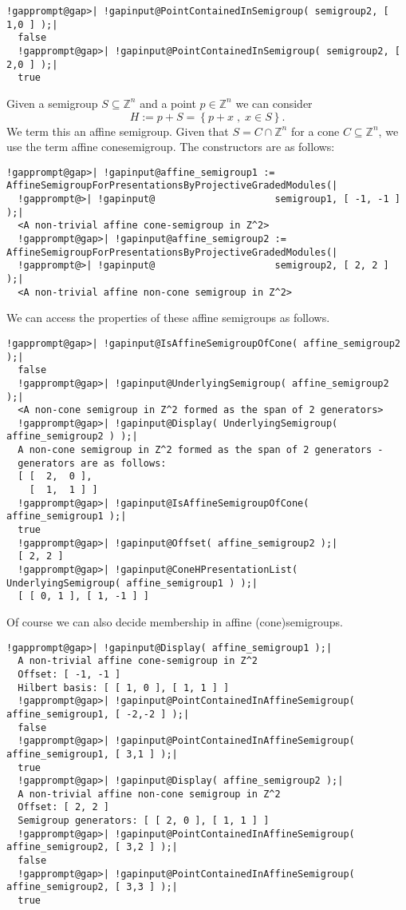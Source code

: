 \documentclass[a4paper,11pt]{report}
\begin{document}
{{\begin{Verbatim}[commandchars=!@|,fontsize=\small,frame=single,label=Example]
  !gapprompt@gap>| !gapinput@PointContainedInSemigroup( semigroup2, [ 1,0 ] );|
  false
  !gapprompt@gap>| !gapinput@PointContainedInSemigroup( semigroup2, [ 2,0 ] );|
  true
\end{Verbatim}
 Given a semigroup $S \subseteq \mathbb{Z}^n$ and a point $p \in \mathbb{Z}^n$ we can consider 
\[ H := p + S = \left\{ p + x \; , \; x \in S \right\}. \]
 We term this an affine semigroup. Given that $S = C \cap \mathbb{Z}^n$ for a cone $C \subseteq \mathbb{Z}^n$, we use the term affine cone{\textunderscore}semigroup. The constructors are
as follows: 
\begin{Verbatim}[commandchars=!@|,fontsize=\small,frame=single,label=Example]
  !gapprompt@gap>| !gapinput@affine_semigroup1 := AffineSemigroupForPresentationsByProjectiveGradedModules(|
  !gapprompt@>| !gapinput@                     semigroup1, [ -1, -1 ] );|
  <A non-trivial affine cone-semigroup in Z^2>
  !gapprompt@gap>| !gapinput@affine_semigroup2 := AffineSemigroupForPresentationsByProjectiveGradedModules(|
  !gapprompt@>| !gapinput@                     semigroup2, [ 2, 2 ] );|
  <A non-trivial affine non-cone semigroup in Z^2>
\end{Verbatim}
 We can access the properties of these affine semigroups as follows. 
\begin{Verbatim}[commandchars=!@|,fontsize=\small,frame=single,label=Example]
  !gapprompt@gap>| !gapinput@IsAffineSemigroupOfCone( affine_semigroup2 );|
  false
  !gapprompt@gap>| !gapinput@UnderlyingSemigroup( affine_semigroup2 );|
  <A non-cone semigroup in Z^2 formed as the span of 2 generators>
  !gapprompt@gap>| !gapinput@Display( UnderlyingSemigroup( affine_semigroup2 ) );|
  A non-cone semigroup in Z^2 formed as the span of 2 generators -
  generators are as follows:
  [ [  2,  0 ],
    [  1,  1 ] ]
  !gapprompt@gap>| !gapinput@IsAffineSemigroupOfCone( affine_semigroup1 );|
  true
  !gapprompt@gap>| !gapinput@Offset( affine_semigroup2 );|
  [ 2, 2 ]
  !gapprompt@gap>| !gapinput@ConeHPresentationList( UnderlyingSemigroup( affine_semigroup1 ) );|
  [ [ 0, 1 ], [ 1, -1 ] ]
\end{Verbatim}
 Of course we can also decide membership in affine
(cone{\textunderscore})semigroups. 
\begin{Verbatim}[commandchars=!@|,fontsize=\small,frame=single,label=Example]
  !gapprompt@gap>| !gapinput@Display( affine_semigroup1 );|
  A non-trivial affine cone-semigroup in Z^2
  Offset: [ -1, -1 ]
  Hilbert basis: [ [ 1, 0 ], [ 1, 1 ] ]
  !gapprompt@gap>| !gapinput@PointContainedInAffineSemigroup( affine_semigroup1, [ -2,-2 ] );|
  false
  !gapprompt@gap>| !gapinput@PointContainedInAffineSemigroup( affine_semigroup1, [ 3,1 ] );|
  true
  !gapprompt@gap>| !gapinput@Display( affine_semigroup2 );|
  A non-trivial affine non-cone semigroup in Z^2
  Offset: [ 2, 2 ]
  Semigroup generators: [ [ 2, 0 ], [ 1, 1 ] ]
  !gapprompt@gap>| !gapinput@PointContainedInAffineSemigroup( affine_semigroup2, [ 3,2 ] );|
  false
  !gapprompt@gap>| !gapinput@PointContainedInAffineSemigroup( affine_semigroup2, [ 3,3 ] );|
  true
\end{Verbatim}
 }

 }
\end{document}

